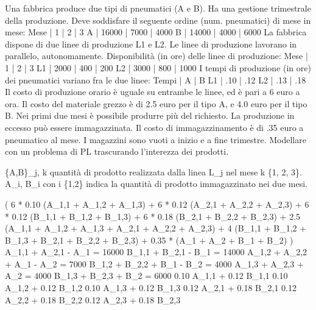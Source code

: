 \begin{esercizio}
	Una fabbrica produce due tipi di pneumatici (A e B).
	Ha una gestione trimestrale della produzione.
	Deve soddisfare il seguente ordine (num. pneumatici) di mese in mese:
    Mese  |     1 |     2 |     3
	A     | 16000 |  7000 |  4000
	B     | 14000 |  4000 |  6000
	La fabbrica dispone di due linee di produzione L1 e L2.
	Le linee di produzione lavorano in parallelo, autonomamente.
	Disponibilit\`a (in ore) delle linee di produzione:
	Mese  |    1 |    2 |    3
	L1    | 2000 |  400 |  200
	L2    | 3000 |  800 | 1000
	I tempi di produzione (in ore) dei pneumatici variano fra le due linee:
	Tempi |   A |   B
	L1    | .10 | .12
	L2    | .13 | .18
	Il costo di produzione orario \`e uguale su entrambe le linee, ed \`e pari a 6 euro a ora.
	Il costo del materiale grezzo \`e di 2.5 euro per il tipo A, e 4.0 euro per il tipo B.
	Nei primi due mesi \`e possibile produrre pi\`u del richiesto.
	La produzione in eccesso pu\`o essere immagazzinata.
	Il costo di immagazzinamento \`e di .35 euro a pneumatico al mese.
	I magazzini sono vuoti a inizio e a fine trimestre.
	Modellare con un problema di PL trascurando l'interezza dei prodotti.

	\{A,B\}_{j, k} quantit\`a di prodotto realizzata dalla linea L_{j} nel mese k \in \{1, 2, 3\}.
	A_{i}, B_{i} con i \in \{1,2\} indica la quantit\`a di prodotto immagazzinato nei due mesi.

	\min (
		6 * 0.10 (A_{1,1} + A_{1,2} + A_{1,3}) + 6 * 0.12 (A_{2,1} + A_{2,2} + A_{2,3}) +
		6 * 0.12 (B_{1,1} + B_{1,2} + B_{1,3}) + 6 * 0.18 (B_{2,1} + B_{2,2} + B_{2,3}) +
		2.5 (A_{1,1} + A_{1,2} + A_{1,3} + A_{2,1} + A_{2,2} + A_{2,3}) +
		4 (B_{1,1} + B_{1,2} + B_{1,3} + B_{2,1} + B_{2,2} + B_{2,3}) +
		0.35 * (A_{1} + A_{2} + B_{1} + B_{2})
	)
	A_{1,1} + A_{2,1} - A_{1} = 16000
	B_{1,1} + B_{2,1} - B_{1} = 14000
	A_{1,2} + A_{2,2} + A_{1} - A_{2} = 7000
	B_{1,2} + B_{2,2} + B_{1} - B_{2} = 4000
	A_{1,3} + A_{2,3} + A_{2} = 4000
	B_{1,3} + B_{2,3} + B_{2} = 6000
	0.10 A_{1,1} + 0.12 B_{1,1} 
	0.10 A_{1,2} + 0.12 B_{1,2} 
	0.10 A_{1,3} + 0.12 B_{1,3} 
	0.12 A_{2,1} + 0.18 B_{2,1} 
	0.12 A_{2,2} + 0.18 B_{2,2} 
	0.12 A_{2,3} + 0.18 B_{2,3} 
\end{esercizio}

